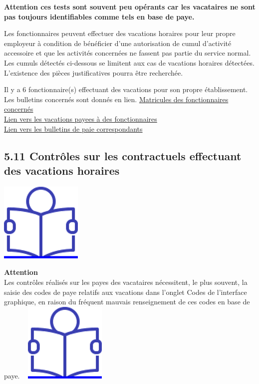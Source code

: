 \textbf{Attention ces tests sont souvent peu opérants car les vacataires
ne sont pas toujours identifiables comme tels en base de paye.}

Les fonctionnaires peuvent effectuer des vacations horaires pour leur
propre employeur à condition de bénéficier d'une autorisation de cumul
d'activité accessoire et que les activités concernées ne fassent pas
partie du service normal. Les cumuls détectés ci-dessous se limitent aux
cas de vacations horaires détectées. L'existence des pièces
justificatives pourra être recherchée.

Il y a 6 fonctionnaire(s) effectuant des vacations pour son propre
établissement. Les bulletins concernés sont donnés en lien.
\href{../Bases/Reglementation/matricules.fonctionnaires.et.vacations.csv}{Matricules
des fonctionnaires concernés}\\
\href{../Bases/Reglementation/lignes.fonctionnaires.et.vacations.csv}{Lien
vers les vacations payees à des fonctionnaires}\\
\href{../Bases/Reglementation/Paie_vac_fonct.csv}{Lien vers les bulletins
de paie correspondants}

\hypertarget{controles-sur-les-contractuels-effectuant-des-vacations-horaires}{%
\subsection{5.11 Contrôles sur les contractuels effectuant des vacations
horaires}\label{controles-sur-les-contractuels-effectuant-des-vacations-horaires}}

\href{../Docs/Notices/fiche_CEV_droit.odt}{\includegraphics{icones/Notice.png}}

\textbf{Attention}\\
Les contrôles réalisés sur les payes des vacataires nécessitent, le plus
souvent, la saisie des codes de paye relatifs aux vacations dans
l'onglet Codes de l'interface graphique, en raison du fréquent mauvais
renseignement de ces codes en base de paye. ~
\href{../Docs/Notices/fiche_onglet_codes.odt}{\includegraphics{icones/Notice.png}}

